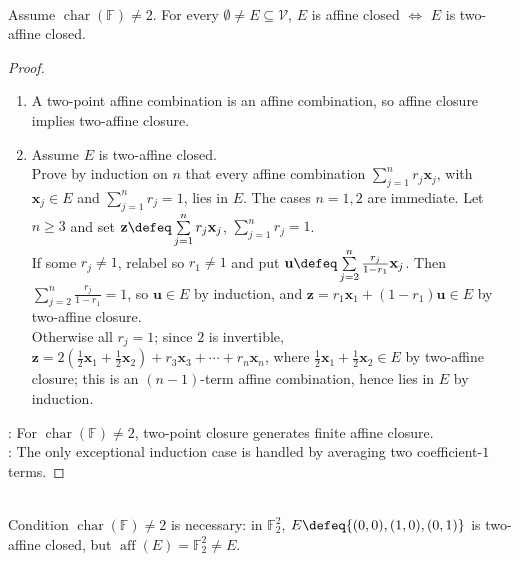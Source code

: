 \begin{theorem} \label{thm:affine-closed-two-affine-closed} \\
Assume $\operatorname{char}(\mathbb{F})\neq2$. For every $\emptyset\neq E\subseteq\mathcal{V}$, $E$ is affine closed $\iff$ $E$ is two-affine closed.
\begin{proof}
\begin{enumerate}[label=\roman*.]
\setlength{\itemsep}{0pt}
\item[$(\Rightarrow)$] A two-point affine combination is an affine combination, so affine closure implies two-affine closure.
\item[$(\Leftarrow)$] Assume $E$ is two-affine closed.\\
Prove by induction on $n$ that every affine combination $\sum\limits_{j=1}^n r_j\mathbf{x}_j$, with $\mathbf{x}_j\in E$ and $\sum\limits_{j=1}^n r_j=1$, lies in $E$. The cases $n=1,2$ are immediate. Let $n\geq3$ and set $\mathbf{z}\defeq\sum\limits_{j=1}^n r_j\mathbf{x}_j$, $\sum\limits_{j=1}^n r_j=1$.\\
If some $r_j\neq1$, relabel so $r_1\neq1$ and put $\mathbf{u}\defeq\sum\limits_{j=2}^n\frac{r_j}{1-r_1}\mathbf{x}_j$. Then $\sum\limits_{j=2}^n \frac{r_j}{1-r_1}=1$, so $\mathbf{u}\in E$ by induction, and $\mathbf{z}=r_1\mathbf{x}_1+(1-r_1)\mathbf{u}\in E$ by two-affine closure.\\
Otherwise all $r_j=1$; since $2$ is invertible, $\mathbf{z} =2\left(\frac12\mathbf{x}_1+\frac12\mathbf{x}_2\right)+r_3\mathbf{x}_3+\cdots+r_n\mathbf{x}_n$, where $\frac12\mathbf{x}_1+\frac12\mathbf{x}_2\in E$ by two-affine closure; this is an $(n-1)$-term affine combination, hence lies in $E$ by induction.
\end{enumerate}
: For $\operatorname{char}(\mathbb{F})\neq2$, two-point closure generates finite affine closure.\\
: The only exceptional induction case is handled by averaging two coefficient-$1$ terms.
\end{proof}
\end{theorem}

\begin{remark} \label{rem:characteristic-two-affine-closure-warning} \\
Condition $\operatorname{char}(\mathbb{F})\neq2$ is necessary: in $\mathbb{F}_2^2$, $E\defeq\{(0,0),(1,0),(0,1)\}$ is two-affine closed, but $\operatorname{aff}(E)=\mathbb{F}_2^2\neq E$.
\end{remark}


